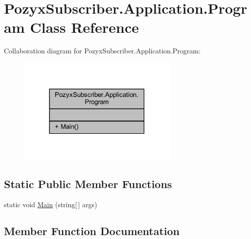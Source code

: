 \hypertarget{class_pozyx_subscriber_1_1_application_1_1_program}{}\section{Pozyx\+Subscriber.\+Application.\+Program Class Reference}
\label{class_pozyx_subscriber_1_1_application_1_1_program}


Collaboration diagram for Pozyx\+Subscriber.\+Application.\+Program\+:\nopagebreak
\begin{figure}[H]
\begin{center}
\leavevmode
\includegraphics[width=225pt]{class_pozyx_subscriber_1_1_application_1_1_program__coll__graph}
\end{center}
\end{figure}
\subsection*{Static Public Member Functions}
\begin{DoxyCompactItemize}
\item 
static void \hyperlink{class_pozyx_subscriber_1_1_application_1_1_program_a35d33857544887b054b88bb37aeff83c}{Main} (string\mbox{[}$\,$\mbox{]} args)
\end{DoxyCompactItemize}


\subsection{Member Function Documentation}
\mbox{\label{class_pozyx_subscriber_1_1_application_1_1_program_a35d33857544887b054b88bb37aeff83c}} 
